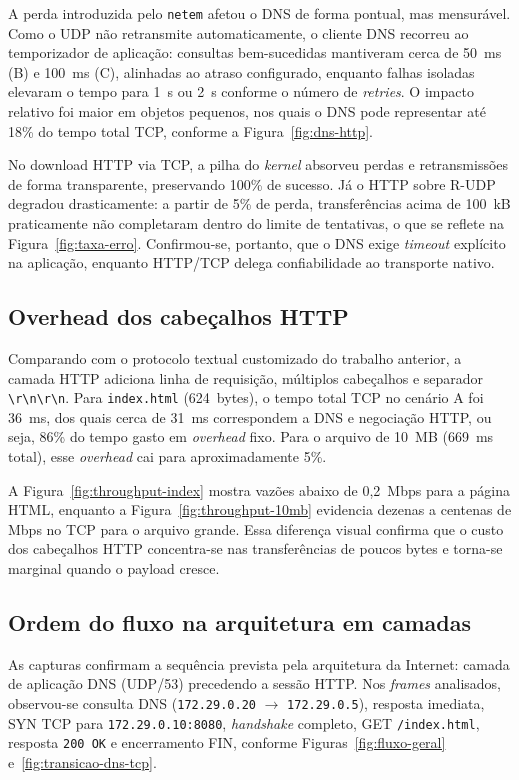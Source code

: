 \documentclass[12pt]{article}
\begin{document}
A perda introduzida pelo \texttt{netem} afetou o DNS de forma pontual, mas
mensurável. Como o UDP não retransmite automaticamente, o cliente DNS recorreu
ao temporizador de aplicação: consultas bem-sucedidas mantiveram cerca de 50~ms
(B) e 100~ms (C), alinhadas ao atraso configurado, enquanto falhas isoladas
elevaram o tempo para 1~s ou 2~s conforme o número de \emph{retries}. O impacto
relativo foi maior em objetos pequenos, nos quais o DNS pode representar até 18\%
do tempo total TCP, conforme a Figura~\ref{fig:dns-http}.

No download HTTP via TCP, a pilha do \emph{kernel} absorveu perdas e
retransmissões de forma transparente, preservando 100\% de sucesso. Já o HTTP
sobre R-UDP degradou drasticamente: a partir de 5\% de perda, transferências
acima de 100~kB praticamente não completaram dentro do limite de tentativas, o
que se reflete na Figura~\ref{fig:taxa-erro}. Confirmou-se, portanto, que o
DNS exige \emph{timeout} explícito na aplicação, enquanto HTTP/TCP delega
confiabilidade ao transporte nativo.

\subsection{Overhead dos cabeçalhos HTTP}

Comparando com o protocolo textual customizado do trabalho anterior, a camada
HTTP adiciona linha de requisição, múltiplos cabeçalhos e separador
\texttt{\textbackslash r\textbackslash n\textbackslash r\textbackslash n}. Para
\texttt{index.html} (624~bytes), o tempo total TCP no cenário A foi 36~ms, dos
quais cerca de 31~ms correspondem a DNS e negociação HTTP, ou seja, 86\% do
tempo gasto em \emph{overhead} fixo. Para o arquivo de 10~MB (669~ms total),
esse \emph{overhead} cai para aproximadamente 5\%.

A Figura~\ref{fig:throughput-index} mostra vazões abaixo de 0,2~Mbps para a
página HTML, enquanto a Figura~\ref{fig:throughput-10mb} evidencia dezenas a
centenas de Mbps no TCP para o arquivo grande. Essa diferença visual confirma
que o custo dos cabeçalhos HTTP concentra-se nas transferências de poucos bytes
e torna-se marginal quando o payload cresce.

\subsection{Ordem do fluxo na arquitetura em camadas}

As capturas confirmam a sequência prevista pela arquitetura da Internet: camada
de aplicação DNS (UDP/53) precedendo a sessão HTTP. Nos \emph{frames} analisados,
observou-se consulta DNS (\texttt{172.29.0.20} $\rightarrow$ \texttt{172.29.0.5}),
resposta imediata, SYN TCP para \texttt{172.29.0.10:8080}, \emph{handshake}
completo, GET \texttt{/index.html}, resposta \texttt{200 OK} e encerramento FIN,
conforme Figuras~\ref{fig:fluxo-geral} e~\ref{fig:transicao-dns-tcp}.
\end{document}
